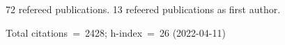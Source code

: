 72 refereed publications. 13 refeered publications as first author.

Total citations~=~2428; h-index~=~26 (2022-04-11)